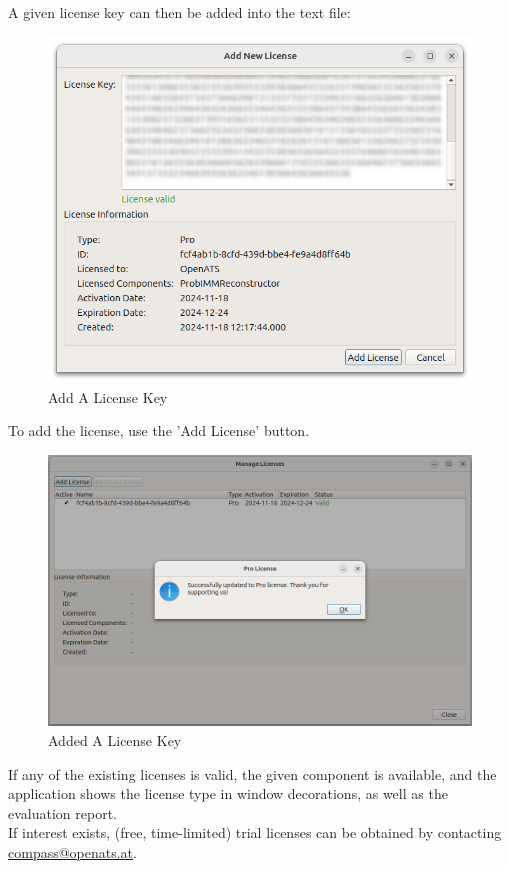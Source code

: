 A given license key can then be added into the text file:


\begin{figure}[H]
    \includegraphics[width=14cm]{figures/configure_license_add2.png}
  \caption{Add A License Key}
\end{figure}

To add the license, use the 'Add License' button.

\begin{figure}[H]
    \includegraphics[width=14cm]{figures/configure_license_add3.png}
  \caption{Added A License Key}
\end{figure}

If any of the existing licenses is valid, the given component is available, and the application shows the license type in window decorations, as well as the evaluation report. \\

If interest exists, (free, time-limited) trial licenses can be obtained by contacting \href{mailto:compass@openats.at}{compass@openats.at}.

